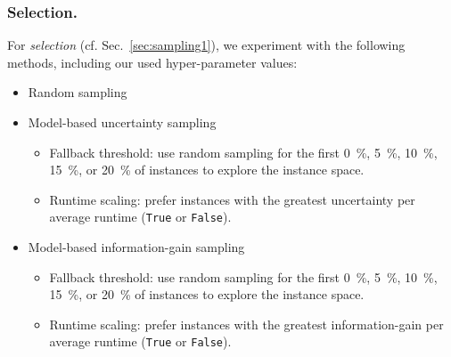 \documentclass[runningheads]{llncs}
\begin{document}
\subsubsection{Selection.}
For \emph{selection} (cf. Sec.~\ref{sec:sampling1}), we experiment with the following methods, including our used hyper-parameter values:
\begin{itemize}
  \item Random sampling 
  \item Model-based uncertainty sampling
  \begin{itemize}
    \item Fallback threshold: use random sampling for the first \SI{0}{\%}, \SI{5}{\%}, \SI{10}{\%}, \SI{15}{\%}, or \SI{20}{\%} of instances to explore the instance space.
    \item Runtime scaling: prefer instances with the greatest uncertainty per average runtime (\texttt{True} or \texttt{False}).
  \end{itemize}

  \item Model-based information-gain sampling
  \begin{itemize}
    \item Fallback threshold: use random sampling for the first \SI{0}{\%}, \SI{5}{\%}, \SI{10}{\%}, \SI{15}{\%}, or \SI{20}{\%} of instances to explore the instance space.
    \item Runtime scaling: prefer instances with the greatest information-gain per average runtime (\texttt{True} or \texttt{False}).
  \end{itemize}
\end{itemize}
\end{document}
